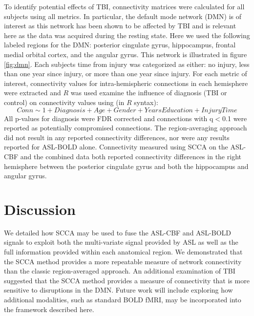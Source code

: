 \documentclass{llncs}
\begin{document}
 To identify potential effects of TBI, connectivity matrices were calculated for all subjects using all metrics. In particular, the default mode network (DMN) is of interest as this network has been shown to be affected by TBI \cite{Johnson2012} and is relevant here as the data was acquired during the resting state. Here we used the following labeled regions for the DMN: posterior cingulate gyrus, hippocampus, frontal medial orbital cortex, and the angular gyrus. This network is illustrated in figure \ref{fig:dmn}. Each subjects time from injury was categorized as either: no injury, less than one year since injury, or more than one year since injury. For each metric of interest, connectivity values for intra-hemispheric connections in each hemisphere were extracted and $R$ was used examine the influence of diagnosis (TBI or control) on connectivity values using (in $R$ syntax):
\begin{equation}
Conn \sim 1 + Diagnosis + Age + Gender + YearsEducation + InjuryTime
\end{equation}
All p-values for diagnosis were FDR corrected and connections with q$<$0.1 were reported as potentially compromised connections. The region-averaging approach did not result in any reported connectivity differences, nor were any results reported for ASL-BOLD alone. Connectivity measured using SCCA on the ASL-CBF and the combined data both reported connectivity differences in the right hemisphere between the posterior cingulate gyrus and both the hippocampus and angular gyrus.
 

\section{Discussion}
We detailed how SCCA may be used to fuse the ASL-CBF and ASL-BOLD signals to exploit both the multi-variate signal provided by ASL as well as the full information provided within each anatomical region. We demonstrated that the SCCA method provides a more repeatable measure of network connectivity than the classic region-averaged approach. An additional examination of TBI suggested that the SCCA method provides a measure of connectivity that is more sensitive to disruptions in the DMN.  Future work will include exploring how additional modalities, such as standard BOLD fMRI, may be incorporated into the framework described here.
\end{document}
